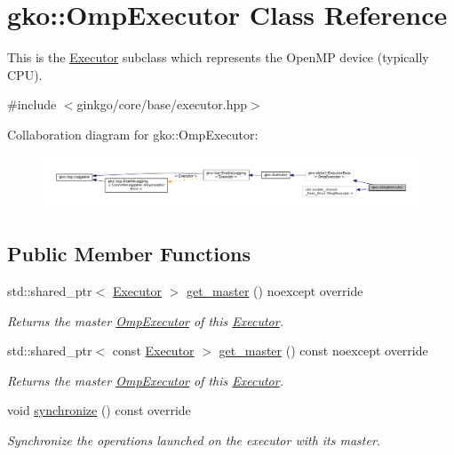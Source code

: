 \hypertarget{classgko_1_1OmpExecutor}{}\section{gko\+:\+:Omp\+Executor Class Reference}
\label{classgko_1_1OmpExecutor}


This is the \hyperlink{classgko_1_1Executor}{Executor} subclass which represents the Open\+MP device (typically C\+PU).  




{\ttfamily \#include $<$ginkgo/core/base/executor.\+hpp$>$}



Collaboration diagram for gko\+:\+:Omp\+Executor\+:
\nopagebreak
\begin{figure}[H]
\begin{center}
\leavevmode
\includegraphics[width=350pt]{classgko_1_1OmpExecutor__coll__graph}
\end{center}
\end{figure}
\subsection*{Public Member Functions}
\begin{DoxyCompactItemize}
\item 
std\+::shared\+\_\+ptr$<$ \hyperlink{classgko_1_1Executor}{Executor} $>$ \hyperlink{classgko_1_1OmpExecutor_a5b83349e601d473cf8768c0bdbcaca8c}{get\+\_\+master} () noexcept override
\begin{DoxyCompactList}\small\item\em Returns the master \hyperlink{classgko_1_1OmpExecutor}{Omp\+Executor} of this \hyperlink{classgko_1_1Executor}{Executor}. \end{DoxyCompactList}\item 
std\+::shared\+\_\+ptr$<$ const \hyperlink{classgko_1_1Executor}{Executor} $>$ \hyperlink{classgko_1_1OmpExecutor_ab297a7eba78463784d4d2ca08b03c675}{get\+\_\+master} () const noexcept override
\begin{DoxyCompactList}\small\item\em Returns the master \hyperlink{classgko_1_1OmpExecutor}{Omp\+Executor} of this \hyperlink{classgko_1_1Executor}{Executor}. \end{DoxyCompactList}\item 
\mbox{\label{classgko_1_1OmpExecutor_ad4e421dcc3d1e5c7e396167a122e57ae}} 
void \hyperlink{classgko_1_1OmpExecutor_ad4e421dcc3d1e5c7e396167a122e57ae}{synchronize} () const override
\begin{DoxyCompactList}\small\item\em Synchronize the operations launched on the executor with its master. \end{DoxyCompactList}\end{DoxyCompactItemize}
